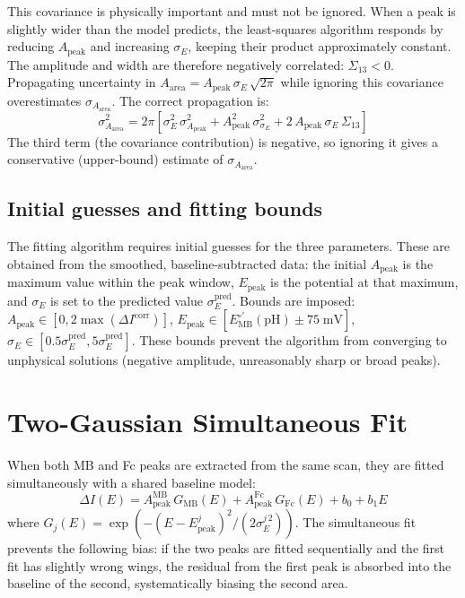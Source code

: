 \documentclass[10pt,a4paper]{article}
\numberwithin{equation}{section}
\newcommand{\Eo}{E^{\circ\prime}}
\newcommand{\Apk}{A_{\text{peak}}}
\newcommand{\Aarea}{A_{\text{area}}}
\newcommand{\Epk}{E_{\text{peak}}}
\newcommand{\DI}{\Delta I}
\begin{document}
This covariance is physically important and must not be ignored. When a peak
is slightly wider than the model predicts, the least-squares algorithm
responds by reducing $\Apk$ and increasing $\sigma_E$, keeping their
product approximately constant. The amplitude and width are therefore
negatively correlated: $\Sigma_{13} < 0$. Propagating uncertainty in
$\Aarea = \Apk\,\sigma_E\,\sqrt{2\pi}$ while ignoring this covariance
overestimates $\sigma_{\Aarea}$. The correct propagation is:
\begin{equation}
  \sigma_{\Aarea}^2 = 2\pi\!\left[
    \sigma_E^2\,\sigma_{\Apk}^2
    + \Apk^2\,\sigma_{\sigma_E}^2
    + 2\,\Apk\,\sigma_E\,\Sigma_{13}
  \right]
  \label{eq:sigarea}
\end{equation}
The third term (the covariance contribution) is negative, so ignoring it
gives a conservative (upper-bound) estimate of $\sigma_{\Aarea}$.

\subsection{Initial guesses and fitting bounds}

The fitting algorithm requires initial guesses for the three parameters.
These are obtained from the smoothed, baseline-subtracted data: the initial
$\Apk$ is the maximum value within the peak window, $\Epk$ is the potential
at that maximum, and $\sigma_E$ is set to the predicted value
$\sigma_E^\text{pred}$. Bounds are imposed:
$\Apk \in [0, 2\max(\DI^\text{corr})]$,
$\Epk \in [\Eo_\text{MB}(\text{pH}) \pm 75\;\text{mV}]$,
$\sigma_E \in [0.5\sigma_E^\text{pred}, 5\sigma_E^\text{pred}]$.
These bounds prevent the algorithm from converging to unphysical solutions
(negative amplitude, unreasonably sharp or broad peaks).

\section{Two-Gaussian Simultaneous Fit}
\label{sec:twogauss}

When both MB and Fc peaks are extracted from the same scan, they are fitted
simultaneously with a shared baseline model:
\begin{equation}
  \DI(E) = \Apk^\text{MB}\,G_\text{MB}(E)
  + \Apk^\text{Fc}\,G_\text{Fc}(E)
  + b_0 + b_1 E
  \label{eq:twogauss}
\end{equation}
where $G_j(E) = \exp(-(E-\Epk^j)^2/(2\sigma_E^{j\,2}))$. The simultaneous
fit prevents the following bias: if the two peaks are fitted sequentially
and the first fit has slightly wrong wings, the residual from the first peak
is absorbed into the baseline of the second, systematically biasing the
second area.
\end{document}
